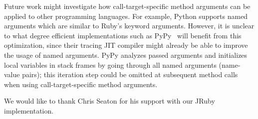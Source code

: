 \documentclass{sigplanconf} %
\begin{document}
Future work might investigate how call-target-specific method arguments can be applied to other programming languages. For example, Python supports named arguments which are similar to Ruby's keyword arguments. However, it is unclear to what degree efficient implementations such as PyPy~\cite{Bolz:2009:TMP:1565824.1565827} will benefit from this optimization, since their tracing JIT compiler might already be able to improve the usage of named arguments. PyPy analyzes passed arguments and initializes local variables in stack frames by going through all named arguments (name-value pairs); this iteration step could be omitted at subsequent method calls when using call-target-specific method arguments.

\acks
We would like to thank Chris Seaton for his support with our JRuby implementation.

%


\appendix
\end{document}
